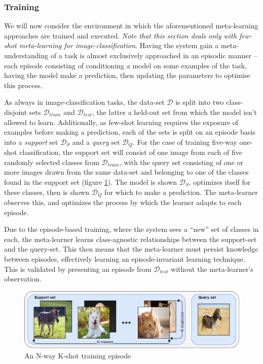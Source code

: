 \documentclass{report}
\begin{document}
	\subsubsection{Training}
	We will now consider the environment in which the aforementioned meta-learning approaches are trained and executed. \textit{Note that this section deals only with few-shot meta-learning for image-classification}. Having the system gain a meta-understanding of a task is almost exclusively approached in an episodic manner -- each episode consisting of conditioning a model on some examples of the task, having the model make a prediction, then updating the parameters to optimise this process. \par
	As always in image-classification tasks, the data-set $\mathcal{D}$ is split into two class-disjoint sets $\mathcal{D}_{train}$ and $\mathcal{D}_{test}$, the latter a held-out set from which the model isn't allowed to learn. Additionally, as few-shot learning requires the exposure of examples before making a prediction, each of the sets is split on an episode basis into a \textit{support} set $\mathcal{D}_{S}$ and a \textit{query} set $\mathcal{D}_{Q}$. For the case of training five-way one-shot classification, the support set will consist of one image from each of five randomly selected classes from $\mathcal{D}_{train}$, with the query set consisting of one or more images drawn from the same data-set and belonging to one of the classes found in the support set (figure \ref{fig:episode:1}). The model is shown $\mathcal{D}_S$, optimizes itself for these classes, then is shown $\mathcal{D}_Q$ for which to make a prediction. The meta-learner observes this, and optimizes the process by which the learner adapts to each episode. \par
	Due to the episode-based training, where the system sees a ``new'' set of classes in each, the meta-learner learns class-agnostic relationships between the support-set and the query-set. This then means that the meta-learner must persist knowledge between episodes, effectively learning an episode-invariant learning technique. This is validated by presenting an episode from $\mathcal{D}_{test}$ without the meta-learner's observation. \par
	\begin{figure}[!h]
		\centering
		\includegraphics[width=14cm]{episode}
		\caption{An N-way K-shot training episode}
		\label{fig:episode:1}
	\end{figure}
	
\end{document}
